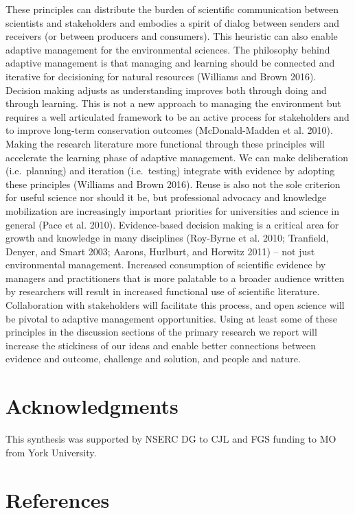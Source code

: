 \documentclass[fleqn,10pt]{wlpeerj} %
\begin{document}
These principles can distribute the burden of scientific communication
between scientists and stakeholders and embodies a spirit of dialog
between senders and receivers (or between producers and consumers). This
heuristic can also enable adaptive management for the environmental
sciences. The philosophy behind adaptive management is that managing and
learning should be connected and iterative for decisioning for natural
resources (Williams and Brown 2016). Decision making adjusts as
understanding improves both through doing and through learning. This is
not a new approach to managing the environment but requires a well
articulated framework to be an active process for stakeholders and to
improve long-term conservation outcomes (McDonald-Madden et al. 2010).
Making the research literature more functional through these principles
will accelerate the learning phase of adaptive management. We can make
deliberation (i.e.~planning) and iteration (i.e.~testing) integrate with
evidence by adopting these principles (Williams and Brown 2016). Reuse
is also not the sole criterion for useful science nor should it be, but
professional advocacy and knowledge mobilization are increasingly
important priorities for universities and science in general (Pace et
al. 2010). Evidence-based decision making is a critical area for growth
and knowledge in many disciplines (Roy-Byrne et al. 2010; Tranfield,
Denyer, and Smart 2003; Aarons, Hurlburt, and Horwitz 2011) -- not just
environmental management. Increased consumption of scientific evidence
by managers and practitioners that is more palatable to a broader
audience written by researchers will result in increased functional use
of scientific literature. Collaboration with stakeholders will
facilitate this process, and open science will be pivotal to adaptive
management opportunities. Using at least some of these principles in the
discussion sections of the primary research we report will increase the
stickiness of our ideas and enable better connections between evidence
and outcome, challenge and solution, and people and nature.

\section*{Acknowledgments}\label{acknowledgments}

This synthesis was supported by NSERC DG to CJL and FGS funding to MO
from York University.

\section*{References}\label{references}
\end{document}
